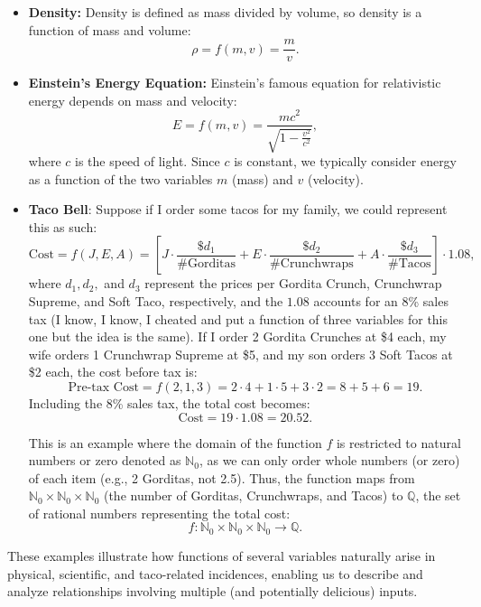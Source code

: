 \begin{itemize}
    \item \textbf{Density:} Density is defined as mass divided by volume, so density is a function of mass and volume:
    \[
    \rho = f(m, v) = \frac{m}{v}.
    \]
    \item \textbf{Einstein's Energy Equation:} Einstein's famous equation for relativistic energy depends on mass and velocity:
    \[
    E = f(m, v) = \frac{mc^2}{\sqrt{1 - \frac{v^2}{c^2}}},
    \]
    where \( c \) is the speed of light. Since \( c \) is constant, we typically consider energy as a function of the two variables \( m \) (mass) and \( v \) (velocity).
\item \textbf{Taco Bell}:  Suppose if I order some tacos for my family, we could represent this as such:
\[
\text{Cost} = f(J, E, A) = \left[J \cdot \frac{\$ d_1}{\text{\# Gorditas}} + E \cdot \frac{\$ d_2}{\text{\# Crunchwraps}} + A \cdot \frac{\$ d_3}{\text{\# Tacos}}\right] \cdot 1.08,
\]
where \( d_1, d_2, \) and \( d_3 \) represent the prices per Gordita Crunch, Crunchwrap Supreme, and Soft Taco, respectively, and the \( 1.08 \) accounts for an 8\% sales tax (I know, I know, I cheated and put a function of three variables for this one but the idea is the same). If I order 2 Gordita Crunches at \$4 each, my wife orders 1 Crunchwrap Supreme at \$5, and my son orders 3 Soft Tacos at \$2 each, the cost before tax is:
\[
\text{Pre-tax Cost} = f(2, 1, 3) = 2 \cdot 4 + 1 \cdot 5 + 3 \cdot 2 = 8 + 5 + 6 = 19.
\]
Including the 8\% sales tax, the total cost becomes:
\[
\text{Cost} = 19 \cdot 1.08 = 20.52.
\]

This is an example where the domain of the function \( f \) is restricted to natural numbers or zero denoted as $\mathbb{N}_0$, as we can only order whole numbers (or zero) of each item (e.g., 2 Gorditas, not 2.5). Thus, the function maps from $\mathbb{N}_0 \times \mathbb{N}_0 \times \mathbb{N}_0$ (the number of Gorditas, Crunchwraps, and Tacos) to $\mathbb{Q}$, the set of rational numbers representing the total cost:
\[
f: \mathbb{N}_0 \times \mathbb{N}_0 \times \mathbb{N}_0 \to \mathbb{Q}.
\]
\end{itemize}

\noindent These examples illustrate how functions of several variables naturally arise in physical, scientific, and taco-related incidences, enabling us to describe and analyze relationships involving multiple (and potentially delicious) inputs.

